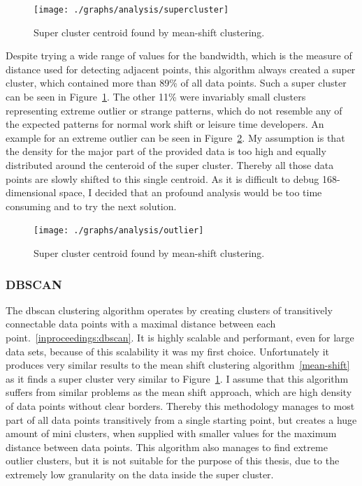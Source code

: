 \begin{figure}[H]
    \texttt{[image: ./graphs/analysis/supercluster]}
    \centering
    \caption{Super cluster centroid found by mean-shift clustering.}\label{fig:mean-shift-super-cluster}
\end{figure}


Despite trying a wide range of values for the bandwidth, which is the measure of distance used for detecting adjacent points, this algorithm always created a super cluster, which contained more than 89\% of all data points. Such a super cluster can be seen in Figure~\ref{fig:mean-shift-super-cluster}.
The other 11\% were invariably small clusters representing extreme outlier or strange patterns, which do not resemble any of the expected patterns for normal work shift or leisure time developers.
An example for an extreme outlier can be seen in Figure~\ref{fig:mean-shift-outlier}.
My assumption is that the density for the major part of the provided data is too high and equally distributed around the centeroid of the super cluster.
Thereby all those data points are slowly shifted to this single centroid.
As it is difficult to debug 168-dimensional space, I decided that an profound analysis would be too time consuming and to try the next solution.

\begin{figure}[H]
    \texttt{[image: ./graphs/analysis/outlier]}
    \centering
    \caption{Super cluster centroid found by mean-shift clustering.}\label{fig:mean-shift-outlier}
\end{figure}

\subsubsection{DBSCAN}
The \ac{dbscan} clustering algorithm operates by creating clusters of transitively connectable data points with a maximal distance between each point.~\ref{inproceedings:dbscan}.
It is highly scalable and performant, even for large data sets, because of this scalability it was my first choice.
Unfortunately it produces very similar results to the mean shift clustering algorithm~\ref{mean-shift} as it finds a super cluster very similar to Figure~\ref{fig:mean-shift-super-cluster}.
I assume that this algorithm suffers from similar problems as the mean shift approach, which are high density of data points without clear borders.
Thereby this methodology manages to most part of all data points transitively from a single starting point, but creates a huge amount of mini clusters, when supplied with smaller values for the maximum distance between data points.
This algorithm also manages to find extreme outlier clusters, but it is not suitable for the purpose of this thesis, due to the extremely low granularity on the data inside the super cluster.


